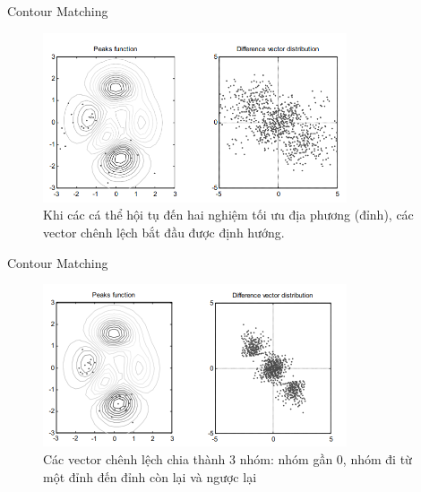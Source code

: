 \begin{frame}{Contour Matching}
  \begin{figure}
    \centering
    \includegraphics[width=0.8\textwidth,height=0.8\textheight,
    keepaspectratio]{res/cm2.png}
\captionsetup{justification=centering,margin=3cm}
    \caption{Khi các cá thể hội tụ đến hai nghiệm tối ưu địa phương (đỉnh), các vector
    chênh lệch bắt đầu được định hướng.}
  \end{figure}
\end{frame}

\begin{frame}{Contour Matching}
  \begin{figure}
    \centering
    \includegraphics[width=0.8\textwidth,height=0.8\textheight,
    keepaspectratio]{res/cm3.png}
\captionsetup{justification=centering,margin=3cm}
    \caption{Các vector chênh lệch chia thành 3 nhóm: nhóm gần 0, nhóm đi từ
    một đỉnh đến đỉnh còn lại và ngược lại}
  \end{figure}
\end{frame}

